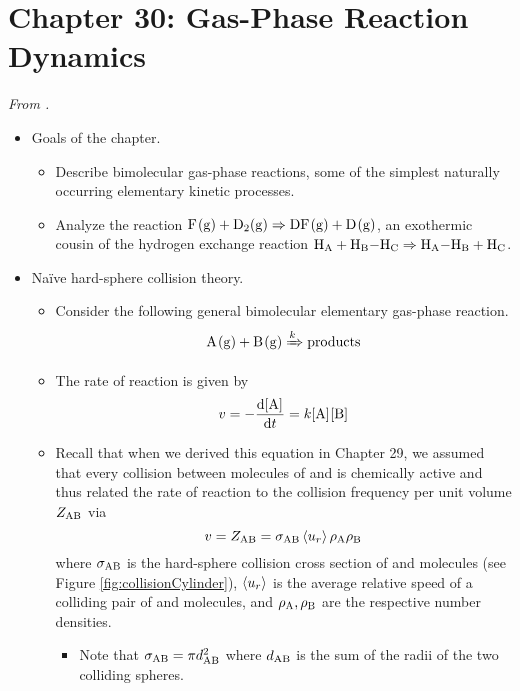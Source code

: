 \documentclass[../notes.tex]{subfiles}
\begin{document}
\section{Chapter 30: Gas-Phase Reaction Dynamics}
\emph{From \textcite{bib:McQuarrieSimon}.}
\begin{itemize}
    \item {}Goals of the chapter.
    \begin{itemize}
        \item Describe bimolecular gas-phase reactions, some of the simplest naturally occurring elementary kinetic processes.
        \item Analyze the reaction $\ce{F(g) + D2(g)}\Rightarrow\ce{DF(g) + D(g)}$, an exothermic cousin of the hydrogen exchange reaction $\ce{H_A + H_B-H_C}\Rightarrow\ce{H_A-H_B + H_C}$.
    \end{itemize}
    \item Na\"{i}ve hard-sphere collision theory.
    \begin{itemize}
        \item Consider the following general bimolecular elementary gas-phase reaction.
        \begin{equation*}
            \ce{A(g) + B(g)} \xRightarrow{k} \text{products}
        \end{equation*}
        \item The rate of reaction is given by
        \begin{equation*}
            v = -\dv{\cnc{A}}{t}
            = k\cnc{A}\cnc{B}
        \end{equation*}
        \item Recall that when we derived this equation in Chapter 29, we assumed that every collision between molecules of  and  is chemically active and thus related the rate of reaction to the collision frequency per unit volume $Z_{\ce{A}\ce{B}}$ via
        \begin{equation*}
            v = Z_{\ce{A}\ce{B}}
            = \sigma_{\ce{A}\ce{B}}\prb{u_r}\rho_{\ce{A}}\rho_{\ce{B}}
        \end{equation*}
        where $\sigma_{\ce{A}\ce{B}}$ is the hard-sphere collision cross section of  and  molecules (see Figure \ref{fig:collisionCylinder}), $\left\langle{u_r}\right\rangle$ is the average relative speed of a colliding pair of  and  molecules, and $\rho_{\ce{A}},\rho_{\ce{B}}$ are the respective number densities.
        \begin{itemize}
            \item Note that $\sigma_{\ce{A}\ce{B}}=\pi d_{\ce{A}\ce{B}}^2$ where $d_{\ce{A}\ce{B}}$ is the sum of the radii of the two colliding spheres.

\end{itemize}
\end{itemize}
\end{itemize}
\end{document}
